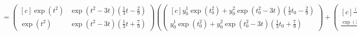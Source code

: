 \begin{solution}
\begin{align*}
        &= \begin{pmatrix*}[c]
          \exp(t^2) & \exp(t^2-3t)(\frac{1}{3}t - \frac{2}{9}) \\
          \exp(t^2) & \exp(t^2-3t)(\frac{1}{3}t + \frac{7}{9})
        \end{pmatrix*}
        \left(\begin{pmatrix*}[c]
            y_0^1\exp(t_0^2) + y_0^2\exp(t_0^2-3t)(\frac{1}{3}t_0 - \frac{2}{9}) \\
            y_0^1\exp(t_0^2) + y_0^2\exp(t_0^2-3t)(\frac{1}{3}t_0 + \frac{7}{9})
          \end{pmatrix*} +
        \begin{pmatrix*}[c]
            \frac{(t-t_0)^3 + 2(t-t_0)^2 + 2(t-t_0)}{9} \\
            \frac{\exp(3t)(4 - 3t) + \exp(3t_0)(3t_0 - 4)}{9}
          \end{pmatrix*} \right)\\
\end{align*}

\end{solution}
